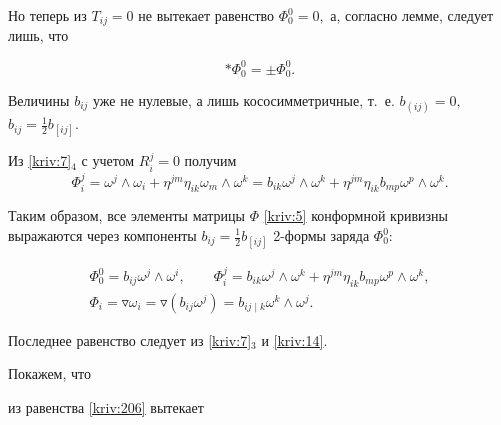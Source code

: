 Но теперь из $T_{ij}=0$ не вытекает равенство $\Phi _{0}^{0}=0,$ а, согласно лемме, следует лишь, что 

\begin{equation}

\ast \Phi _{0}^{0}=\pm \Phi _{0}^{0}.  \label{kriv:206}

\end{equation}

Величины $b_{ij}$ уже не нулевые, а лишь кососимметричные, т.~е. $b_{\left( ij\right) }=0,$ ${b_{ij}=\frac{1}{2}b_{\left[ ij\right] }.}$ 

Из \eqref{kriv:7}$_{4}$ с учетом $R_{i}^{j}=0$ получим\begin{equation*}

\Phi _{i}^{j}=\omega ^{j}\wedge \omega _{i}+\eta ^{jm}\eta _{ik}\omega

_{m}\wedge \omega ^{k}=b_{ik}\omega ^{j}\wedge \omega ^{k}+\eta ^{jm}\eta

_{ik}b_{mp}\omega ^{p}\wedge \omega ^{k}.

\end{equation*}



Таким образом, все элементы матрицы $\Phi $ \eqref{kriv:5} конформной кривизны выражаются через компоненты $b_{ij}=\frac{1}{2}b_{\left[ ij\right] }$ 2-формы заряда $\Phi _{0}^{0}$:

\begin{equation}

\begin{array}{c}

\Phi _{0}^{0}=b_{ij}\omega ^{j}\wedge \omega ^{i},\qquad \Phi

_{i}^{j}=b_{ik}\omega ^{j}\wedge \omega ^{k}+\eta ^{jm}\eta

_{ik}b_{mp}\omega ^{p}\wedge \omega ^{k}, \\ 

\Phi _{i}=\triangledown \omega _{i}=\triangledown \left( b_{ij}\omega

^{j}\right) =b_{ij\mid k}\omega ^{k}\wedge \omega ^{j}.\end{array}

\label{kriv:207}

\end{equation}

Последнее равенство следует из \eqref{kriv:7}$_{3}$ и \eqref{kriv:14}.



Покажем, что 

из равенства \eqref{kriv:206} вытекает 

